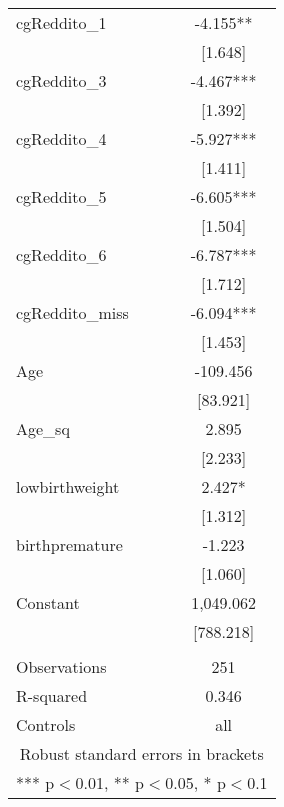 \documentclass[]{article}
\begin{document}
\begin{tabular}{lc}
cgReddito\_1 & -4.155** \\
 & [1.648] \\
cgReddito\_3 & -4.467*** \\
 & [1.392] \\
cgReddito\_4 & -5.927*** \\
 & [1.411] \\
cgReddito\_5 & -6.605*** \\
 & [1.504] \\
cgReddito\_6 & -6.787*** \\
 & [1.712] \\
cgReddito\_miss & -6.094*** \\
 & [1.453] \\
Age & -109.456 \\
 & [83.921] \\
Age\_sq & 2.895 \\
 & [2.233] \\
lowbirthweight & 2.427* \\
 & [1.312] \\
birthpremature & -1.223 \\
 & [1.060] \\
Constant & 1,049.062 \\
 & [788.218] \\
 &  \\
Observations & 251 \\
R-squared & 0.346 \\
 Controls & all \\ \hline
\multicolumn{2}{c}{ Robust standard errors in brackets} \\
\multicolumn{2}{c}{ *** p$<$0.01, ** p$<$0.05, * p$<$0.1} \\
\end{tabular}
\end{document}
